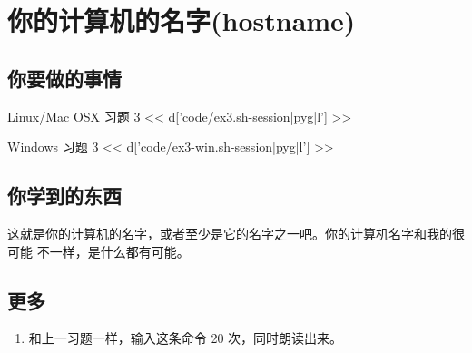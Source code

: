 \chapter{你的计算机的名字(hostname)}

\section{你要做的事情}

\begin{code}{Linux/Mac OSX 习题 3}
<< d['code/ex3.sh-session|pyg|l'] >>
\end{code}

\begin{code}{Windows 习题 3}
<< d['code/ex3-win.sh-session|pyg|l'] >>
\end{code}

\section{你学到的东西}

这就是你的计算机的名字，或者至少是它的名字之一吧。你的计算机名字和我的很可能
不一样，是什么都有可能。

\section{更多}

\begin{enumerate}
\item 和上一习题一样，输入这条命令 20 次，同时朗读出来。
\end{enumerate}

